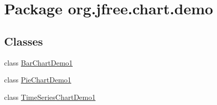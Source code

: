 \hypertarget{namespaceorg_1_1jfree_1_1chart_1_1demo}{}\section{Package org.\+jfree.\+chart.\+demo}
\label{namespaceorg_1_1jfree_1_1chart_1_1demo}
\subsection*{Classes}
\begin{DoxyCompactItemize}
\item 
class \mbox{\hyperlink{classorg_1_1jfree_1_1chart_1_1demo_1_1_bar_chart_demo1}{Bar\+Chart\+Demo1}}
\item 
class \mbox{\hyperlink{classorg_1_1jfree_1_1chart_1_1demo_1_1_pie_chart_demo1}{Pie\+Chart\+Demo1}}
\item 
class \mbox{\hyperlink{classorg_1_1jfree_1_1chart_1_1demo_1_1_time_series_chart_demo1}{Time\+Series\+Chart\+Demo1}}
\end{DoxyCompactItemize}
